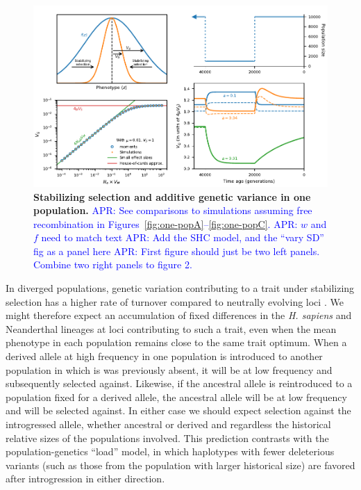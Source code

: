 \documentclass{article}
\newcommand{\aprcomment}[1]{{\textcolor{blue}{APR: #1}}}
\begin{document}
\begin{figure}[tb!]
    \centering
    \includegraphics{../figures/one_pop.pdf}
    \caption{
        \textbf{Stabilizing selection and additive genetic variance in one population.}
        \aprcomment{See comparisons to simulations assuming free recombination in
        Figures~\ref{fig:one-popA}--\ref{fig:one-popC}.}
        \aprcomment{$w$ and $f$ need to match text}
        \aprcomment{Add the SHC model, and the ``vary SD'' fig as a panel here}
        \aprcomment{First figure should just be two left panels. Combine two
        right panels to figure 2.}
    }
    \label{fig:stab-sel}
\end{figure}

In diverged populations, genetic variation contributing to a trait under
stabilizing selection has a higher rate of turnover compared to neutrally
evolving loci \citep{yair2022population}. We might therefore expect an
accumulation of fixed differences in the \emph{H. sapiens} and Neanderthal
lineages at loci contributing to such a trait, even when the mean phenotype in
each population remains close to the same trait optimum. When a derived allele
at high frequency in one population is introduced to another population in
which is was previously absent, it will be at low frequency and subsequently
selected against. Likewise, if the ancestral allele is reintroduced to a
population fixed for a derived allele, the ancestral allele will be at low
frequency and will be selected against. In either case we should expect
selection against the introgressed allele, whether ancestral or derived and
regardless the historical relative sizes of the populations involved. This
prediction contrasts with the population-genetics ``load'' model, in which
haplotypes with fewer deleterious variants (such as those from the population
with larger historical size) are favored after introgression in either
direction.
\end{document}
